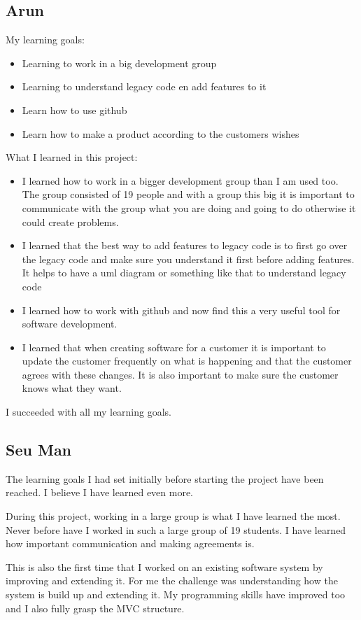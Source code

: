 \documentclass{article}
\begin{document}
\begin{enumerate}
\subsection*{Arun}
My  learning goals:
\begin{itemize}
\item Learning to work in a big development group
\item Learning to understand legacy code en add features to it
\item Learn how to use github
\item Learn how to make a product according to the customers wishes
\end{itemize}

What I learned in this project:
\begin{itemize}
\item I learned how to work in a bigger development group than I am used too. The group consisted of 19 people and with a group this big it is important to communicate with the group what you are doing and going to do otherwise it could create problems.
\item I learned that the best way to add features to legacy code is to first go over the legacy code and make sure you understand it first before adding features. It helps to have a uml diagram or something like that to understand legacy code
\item I learned how to work with github and now find this a very useful tool for software development.
\item I learned that when creating software for a customer it is important to update the customer frequently on what is happening and that the customer agrees with these changes. It is also important to make sure the customer knows what they want.
\end{itemize}

I succeeded with all my  learning goals.
 

\subsection*{Seu Man}
The learning goals I had set initially before starting the project have been reached. I believe I have learned even more. 

During this project, working in a large group is what I have learned the most. Never before have I worked in such a large group of 19 students. I have learned how important communication and making agreements is.

This is also the first time that I worked on an existing software system by improving and extending it. For me the challenge was understanding how the system is build up and extending it. My programming skills have improved too and I also fully grasp the MVC structure.


\end{enumerate}
\end{document}
